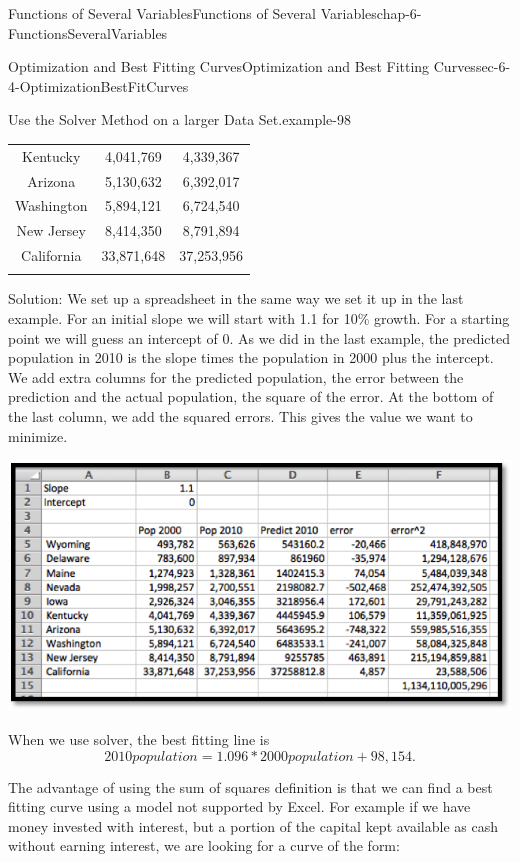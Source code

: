 \documentclass[oneside,10pt,]{book}
\numberwithin{equation}{section}
\newcommand{\hrulethin}  {\noalign{\hrule height 0.04em}}
\begin{document}
\begin{chapterptx}{Functions of Several Variables}{}{Functions of Several Variables}{}{}{chap-6-FunctionsSeveralVariables}
\begin{sectionptx}{Optimization and Best Fitting Curves}{}{Optimization and Best Fitting Curves}{}{}{sec-6-4-OptimizationBestFitCurves}
\begin{example}{Use the Solver Method on a larger Data Set.}{example-98}
\begin{sidebyside}{1}{0}{0}{0}
\begin{sbspanel}{1}
{\begin{tabular}{ccc}
Kentucky&4,041,769&4,339,367\tabularnewline\hrulethin
Arizona&5,130,632&6,392,017\tabularnewline\hrulethin
Washington&5,894,121&6,724,540\tabularnewline\hrulethin
New Jersey&8,414,350&8,791,894\tabularnewline\hrulethin
California&33,871,648&37,253,956\tabularnewline\hrulethin
\end{tabular}
\par}
\end{sbspanel}%
\end{sidebyside}%
\par
\hypertarget{p-2457}{}%
Solution:  We set up a spreadsheet in the same way we set it up in the last example.  For an initial slope we will start with 1.1 for 10\% growth.  For a starting point we will guess an intercept of 0.  As we did in the last example, the predicted population in 2010 is the slope times the population in 2000 plus the intercept.  We add extra columns for the predicted population, the error between the prediction and the actual population, the square of the error.  At the bottom of the last column, we add the squared errors.  This gives the value we want to minimize.%
\begin{sidebyside}{1}{0.1}{0.1}{0}%
\begin{sbspanel}{0.8}%
\includegraphics[width=1\linewidth]{images/sec-6-4-5.png}
\end{sbspanel}%
\end{sidebyside}%
\par
\hypertarget{p-2458}{}%
When we use solver, the best fitting line is%
%
\begin{equation*}
2010population=1.096*2000population+98,154.
\end{equation*}
\end{example}
\hypertarget{p-2459}{}%
The advantage of using the sum of squares definition is that we can find a best fitting curve using a model not supported by Excel.  For example if we have money invested with interest, but a portion of the capital kept available as cash without earning interest, we are looking for a curve of the form:%

\end{sectionptx}
\end{chapterptx}
\end{document}

